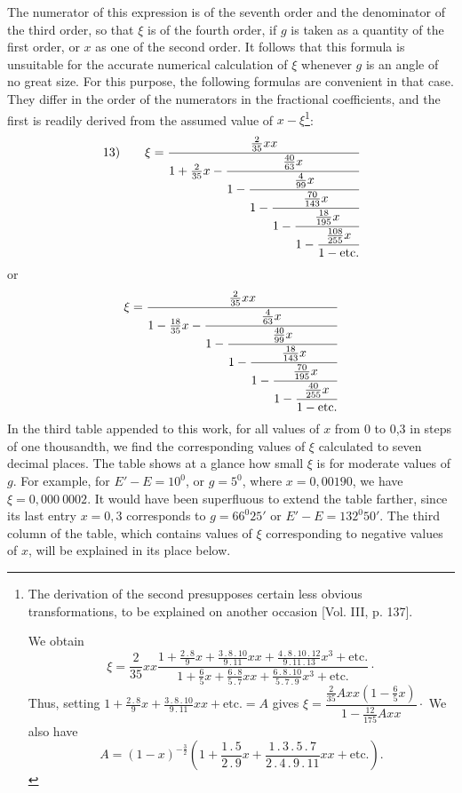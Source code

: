 The numerator of this expression is of the seventh order and the denominator of the third order, so that $\xi$ is of the fourth order, if $g$ is taken as a quantity of the first order, or $x$ as one of the second order. It follows that this formula is unsuitable for the accurate numerical calculation of $\xi$ whenever $g$ is an angle of no great size. For this purpose, the following formulas are convenient in that case. They differ in the order of the numerators in the fractional coefficients, and the first is readily derived from the assumed value of $x-\xi$\footnote{The derivation of the second presupposes certain less obvious transformations, to be explained on another occasion [Vol. III, p. 137].
\par [Manuscript note:] We obtain
\[
\xi=\dfrac{2}{35}xx\dfrac{1+\frac{2\mathbin{.}8}{9}x+\frac{3\mathbin{.}8\mathbin{.}10}{9\mathbin{.}11}xx+\frac{4\mathbin{.}8\mathbin{.}10\mathbin{.}12}{9\mathbin{.}11\mathbin{.}13}x^3+\text{etc.}}{1+\frac65x+\frac{6\mathbin{.}8}{5\mathbin{.}7}xx+\frac{6\mathbin{.}8\mathbin{.}10}{5\mathbin{.}7\mathbin{.}9}x^3+\text{etc.}}\mathpunct{\cdot}
\]
Thus, setting $1+\frac{2\mathbin{.}8}{9}x+\frac{3\mathbin{.}8\mathbin{.}10}{9\mathbin{.}11}xx+\text{etc.}=A$ gives $\xi=\dfrac{\frac{2}{35}Axx(1-\frac65x)}{1-\frac{12}{175}Axx}\mathpunct{\cdot}$ We also have
\[
A=(1-x)^{-\frac32}\left(1+\frac{1\mathbin{.}5}{2\mathbin{.}9}x+\frac{1\mathbin{.}3\mathbin{.}5\mathbin{.}7}{2\mathbin{.}4\mathbin{.}9\mathbin{.}11}xx+\text{etc.}\right).
\]
}:
\[
\mathrm{13)}\qquad \xi=\cfrac{\tfrac{2}{35}xx}{1+\tfrac{2}{35}x-\cfrac{\tfrac{40}{63}x}{1-\cfrac{\tfrac{4}{99}x}{1-\cfrac{\tfrac{70}{143}x}{1-\cfrac{\tfrac{18}{195}x}{1-\cfrac{\tfrac{108}{255}x}{1-\text{etc.}}}}}}}
\]
or
\[
\xi=\cfrac{\tfrac{2}{35}xx}{1-\tfrac{18}{35}x-\cfrac{\tfrac{4}{63}x}{1-\cfrac{\tfrac{40}{99}x}{1-\cfrac{\tfrac{18}{143}x}{1-\cfrac{\tfrac{70}{195}x}{1-\cfrac{\tfrac{40}{255}x}{1-\text{etc.}}}}}}}
\]
In the third table appended to this work, for all values of $x$ from 0 to 0,3 in steps of one thousandth, we find the corresponding values of $\xi$ calculated to seven decimal places. The table shows at a glance how small $\xi$ is for moderate values of $g$. For example, for $E'-E=10^0$, or $g=5^0$, where $x=0{,}00190$, we have $\xi=0{,}000\ 0002$. It would have been superfluous to extend the table farther, since its last entry $x=0{,}3$ corresponds to $g=66^0 25'$ or $E'-E=132^0 50'$. The third column of the table, which contains values of $\xi$ corresponding to negative values of $x$, will be explained in its place below.
